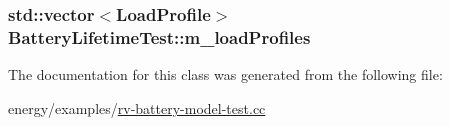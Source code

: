 \subsubsection[{\texorpdfstring{m\+\_\+load\+Profiles}{m_loadProfiles}}]{\setlength{\rightskip}{0pt plus 5cm}std\+::vector$<${\bf Load\+Profile}$>$ Battery\+Lifetime\+Test\+::m\+\_\+load\+Profiles}\hypertarget{classBatteryLifetimeTest_aee9ad324da18f58ee75689778580c3fb}{}\label{classBatteryLifetimeTest_aee9ad324da18f58ee75689778580c3fb}


The documentation for this class was generated from the following file\+:\begin{DoxyCompactItemize}
\item 
energy/examples/\hyperlink{rv-battery-model-test_8cc}{rv-\/battery-\/model-\/test.\+cc}\end{DoxyCompactItemize}
